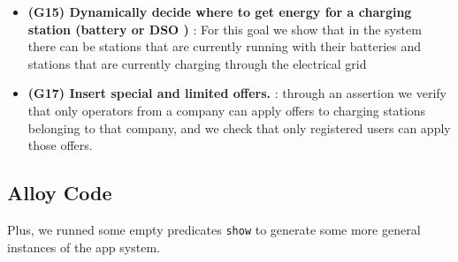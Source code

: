 \documentclass[table, 12pt]{article} %
\begin{document}
\begin{itemize}
        \item \textbf{(G15) Dynamically decide where to get energy for a charging station (battery or DSO ) }: For this goal we show that in the system there can be stations that are currently running with their batteries and stations that are currently charging through the electrical grid 
        \item \textbf{(G17) Insert special and limited offers. }: through an assertion we verify that only operators from a company can apply offers to charging stations belonging to that company, and we check that only registered users can apply those offers.
 
        
    \end{itemize}

    \subsection{Alloy Code}
    

    Plus, we runned some empty predicates \texttt{show} to generate some more general instances of the app system.

    
\end{document}
